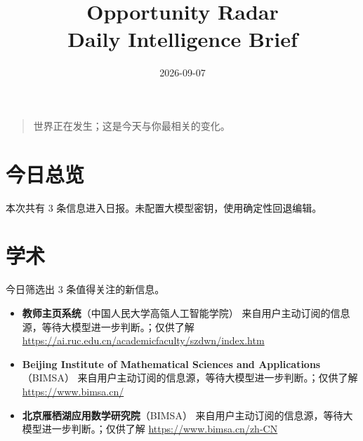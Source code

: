 \documentclass[11pt]{ctexart}
\title{Opportunity Radar\\Daily Intelligence Brief}
\date{2026-09-07}
\begin{document}
\maketitle
\begin{quote}\Large 世界正在发生；这是今天与你最相关的变化。\end{quote}
\section*{今日总览}
本次共有 3 条信息进入日报。未配置大模型密钥，使用确定性回退编辑。
\section*{学术}
今日筛选出 3 条值得关注的新信息。
\begin{itemize}
\item \textbf{教师主页系统}（中国人民大学高瓴人工智能学院） 来自用户主动订阅的信息源，等待大模型进一步判断。；仅供了解 \url{https://ai.ruc.edu.cn/academicfaculty/szdwn/index.htm}
\item \textbf{Beijing Institute of Mathematical Sciences and Applications}（BIMSA） 来自用户主动订阅的信息源，等待大模型进一步判断。；仅供了解 \url{https://www.bimsa.cn/}
\item \textbf{北京雁栖湖应用数学研究院}（BIMSA） 来自用户主动订阅的信息源，等待大模型进一步判断。；仅供了解 \url{https://www.bimsa.cn/zh-CN}
\end{itemize}
\end{document}
